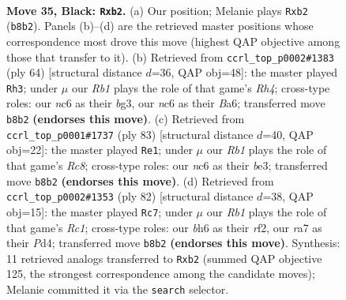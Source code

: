 \documentclass[11pt]{article}
\begin{document}
\clearpage

\begin{figure}[p]\centering
\begin{subfigure}{0.46\textwidth}\centering
\resizebox{\linewidth}{!}{%
\newchessgame
\chessboard[
  setfen={1r4k1/R6p/2N2ppB/8/5P1P/3P4/PPP2PK1/8 b - - 0 35},
  showmover=false,
  pgfstyle=straightmove, color=movearrow, markmove={b8-b2}
]}
\caption{}
\end{subfigure}\hfill
\begin{subfigure}{0.46\textwidth}\centering
\resizebox{\linewidth}{!}{%
\newchessgame
\chessboard[
  setfen={2r2k2/5p1p/B2p1p2/p7/Pp5R/6b1/KPP3P1/8 w - - 6 33},
  showmover=false,
  pgfstyle=straightmove, color=movearrow, markmove={h4-h3}
]}
\caption{}
\end{subfigure}
\\[4pt]
\begin{subfigure}{0.46\textwidth}\centering
\resizebox{\linewidth}{!}{%
\newchessgame
\chessboard[
  setfen={5bk1/R7/4P1p1/1p3p1p/7P/P3B1P1/1P4K1/2r5 b - - 0 42},
  showmover=false,
  pgfstyle=straightmove, color=movearrow, markmove={c1-e1}
]}
\caption{}
\end{subfigure}\hfill
\begin{subfigure}{0.46\textwidth}\centering
\resizebox{\linewidth}{!}{%
\newchessgame
\chessboard[
  setfen={4R3/1p4pk/7p/1P1p2b1/p2P4/3P3P/1P3r2/2R4K w - - 6 42},
  showmover=false,
  pgfstyle=straightmove, color=movearrow, markmove={c1-c7}
]}
\caption{}
\end{subfigure}
\caption{\textbf{Move 35, Black: \texttt{Rxb2}.} (a) Our position; Melanie plays \texttt{Rxb2} (\texttt{b8b2}). Panels (b)--(d) are the retrieved master positions whose correspondence most drove this move (highest QAP objective among those that transfer to it). (b) Retrieved from \texttt{ccrl\_top\_p0002\#1383} (ply 64) [structural distance $d$=36, QAP obj=48]: the master played \texttt{Rh3}; under $\mu$ our \emph{Rb1} plays the role of that game's \emph{Rh4}; cross-type roles: our \emph{n}c6 as their \emph{b}g3, our \emph{n}c6 as their \emph{B}a6; transferred move \texttt{b8b2} \textbf{(endorses this move)}. (c) Retrieved from \texttt{ccrl\_top\_p0001\#1737} (ply 83) [structural distance $d$=40, QAP obj=22]: the master played \texttt{Re1}; under $\mu$ our \emph{Rb1} plays the role of that game's \emph{Rc8}; cross-type roles: our \emph{n}c6 as their \emph{b}e3; transferred move \texttt{b8b2} \textbf{(endorses this move)}. (d) Retrieved from \texttt{ccrl\_top\_p0002\#1353} (ply 82) [structural distance $d$=38, QAP obj=15]: the master played \texttt{Rc7}; under $\mu$ our \emph{Rb1} plays the role of that game's \emph{Rc1}; cross-type roles: our \emph{b}h6 as their \emph{r}f2, our \emph{r}a7 as their \emph{P}d4; transferred move \texttt{b8b2} \textbf{(endorses this move)}. Synthesis: 11 retrieved analogs transferred to \texttt{Rxb2} (summed QAP objective 125, the strongest correspondence among the candidate moves); Melanie committed it via the \texttt{search} selector.}
\label{fig:thought-m69}
\end{figure}
\end{document}
